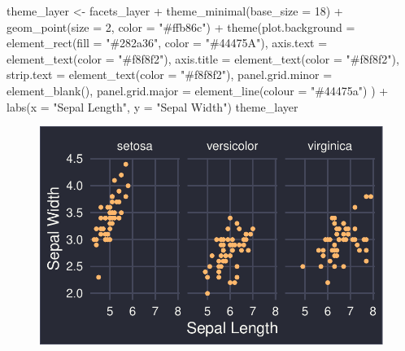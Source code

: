 \documentclass[
  letterpaper,
]{book}
\newenvironment{Shaded}{\begin{snugshade}}{\end{snugshade}}
\newcommand{\AttributeTok}[1]{\textcolor[rgb]{0.40,0.45,0.13}{#1}}
\newcommand{\DecValTok}[1]{\textcolor[rgb]{0.68,0.00,0.00}{#1}}
\newcommand{\FunctionTok}[1]{\textcolor[rgb]{0.28,0.35,0.67}{#1}}
\newcommand{\NormalTok}[1]{\textcolor[rgb]{0.00,0.23,0.31}{#1}}
\newcommand{\OtherTok}[1]{\textcolor[rgb]{0.00,0.23,0.31}{#1}}
\newcommand{\SpecialCharTok}[1]{\textcolor[rgb]{0.37,0.37,0.37}{#1}}
\newcommand{\StringTok}[1]{\textcolor[rgb]{0.13,0.47,0.30}{#1}}
\begin{document}
\begin{Shaded}
\begin{Highlighting}[]
\NormalTok{theme\_layer }\OtherTok{\textless{}{-}}\NormalTok{ facets\_layer }\SpecialCharTok{+} \FunctionTok{theme\_minimal}\NormalTok{(}\AttributeTok{base\_size =} \DecValTok{18}\NormalTok{) }\SpecialCharTok{+}  
  \FunctionTok{geom\_point}\NormalTok{(}\AttributeTok{size =} \DecValTok{2}\NormalTok{, }\AttributeTok{color =} \StringTok{"\#ffb86c"}\NormalTok{) }\SpecialCharTok{+}
  \FunctionTok{theme}\NormalTok{(}\AttributeTok{plot.background =} \FunctionTok{element\_rect}\NormalTok{(}\AttributeTok{fill =} \StringTok{"\#282a36"}\NormalTok{, }\AttributeTok{color =} \StringTok{"\#44475A"}\NormalTok{),}
        \AttributeTok{axis.text =} \FunctionTok{element\_text}\NormalTok{(}\AttributeTok{color =} \StringTok{"\#f8f8f2"}\NormalTok{),}
        \AttributeTok{axis.title =} \FunctionTok{element\_text}\NormalTok{(}\AttributeTok{color =} \StringTok{"\#f8f8f2"}\NormalTok{),}
        \AttributeTok{strip.text =} \FunctionTok{element\_text}\NormalTok{(}\AttributeTok{color =} \StringTok{"\#f8f8f2"}\NormalTok{),}
        \AttributeTok{panel.grid.minor =} \FunctionTok{element\_blank}\NormalTok{(),}
        \AttributeTok{panel.grid.major =} \FunctionTok{element\_line}\NormalTok{(}\AttributeTok{colour =} \StringTok{"\#44475a"}\NormalTok{)}
\NormalTok{        ) }\SpecialCharTok{+}
  \FunctionTok{labs}\NormalTok{(}\AttributeTok{x =} \StringTok{"Sepal Length"}\NormalTok{, }\AttributeTok{y =} \StringTok{"Sepal Width"}\NormalTok{)}
\NormalTok{theme\_layer}
\end{Highlighting}
\end{Shaded}

\begin{figure}[H]

{\centering \includegraphics{./data_viz_files/figure-pdf/unnamed-chunk-12-1.pdf}

}

\end{figure}
\end{document}
